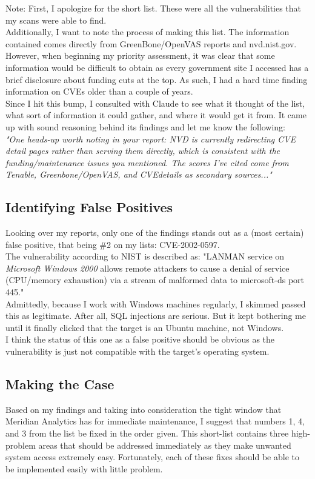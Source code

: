 \documentclass[12pt]{article}
\begin{document}
\noindent Note: First, I apologize for the short list. These were all the vulnerabilities that my scans were able to find.\\
Additionally, I want to note the process of making this list. The information contained comes directly from GreenBone/OpenVAS reports and nvd.nist.gov. However, when beginning my priority assessment, it was clear that some information would be difficult to obtain as every government site I accessed has a brief disclosure about funding cuts at the top. As such, I had a hard time finding information on CVEs older than a couple of years.\\
Since I hit this bump, I consulted with Claude to see what it thought of the list, what sort of information it could gather, and where it would get it from. It came up with sound reasoning behind its findings and let me know the following: \\
\textit{"One heads-up worth noting in your report: NVD is currently redirecting CVE detail pages rather than serving them directly, which is consistent with the funding/maintenance issues you mentioned. The scores I've cited come from Tenable, Greenbone/OpenVAS, and CVEdetails as secondary sources..."}

\subsection{Identifying False Positives}

Looking over my reports, only one of the findings stands out as a (most certain) false positive, that being \#2 on my lists: CVE-2002-0597. \\
The vulnerability according to NIST is described as: "LANMAN service on \textit{Microsoft Windows 2000} allows remote attackers to cause a denial of service (CPU/memory exhaustion) via a stream of malformed data to microsoft-ds port 445." \\
Admittedly, because I work with Windows machines regularly, I skimmed passed this as legitimate. After all, SQL injections are serious. But it kept bothering me until it finally clicked that the target is an Ubuntu machine, not Windows. \\
I think the status of this one as a false positive should be obvious as the vulnerability is just not compatible with the target's operating system.

\subsection{Making the Case}
Based on my findings and taking into consideration the tight window that Meridian Analytics has for immediate maintenance, I suggest that numbers 1, 4, and 3 from the list be fixed in the order given. This short-list contains three high-problem areas that should be addressed immediately as they make unwanted system access extremely easy. Fortunately, each of these fixes should be able to be implemented easily with little problem.
\end{document}
